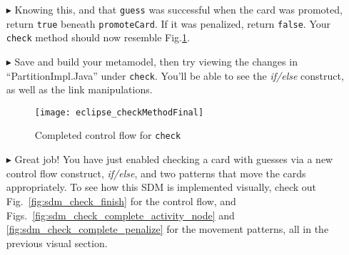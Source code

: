 \begin{itemize}
\vspace{0.5cm}

\item[$\blacktriangleright$] Knowing this, and that \texttt{guess} was successful
when the card was promoted, return \texttt{true} beneath \texttt{promoteCard}. If it was penalized, return \texttt{false}. Your \texttt{check} method
should now resemble Fig.\ref{fig:finalMethod}.

\vspace{0.5cm}

\item[$\blacktriangleright$] Save and build your metamodel, then try viewing the changes in ``PartitionImpl.Java'' under \texttt{check}. You'll be able to
see the \emph{if/else} construct, as well as the link manipulations. 

\newpage

\begin{figure}[htbp]
\begin{center}
  \texttt{[image: eclipse\_checkMethodFinal]}
  \caption{Completed control flow for \texttt{check}}
  \label{fig:finalMethod}
\end{center}
\end{figure}

\item[$\blacktriangleright$] Great job! You have just enabled checking a card with guesses via a new control flow construct, \emph{if/else}, and two patterns
that move the cards appropriately. To see how this SDM is implemented visually, check out Fig.~\ref{fig:sdm_check_finish} for the control flow, and
Figs.~\ref{fig:sdm_check_complete_activity_node} and \ref{fig:sdm_check_complete_penalize} for the movement patterns, all in the previous visual section.

\end{itemize}
 